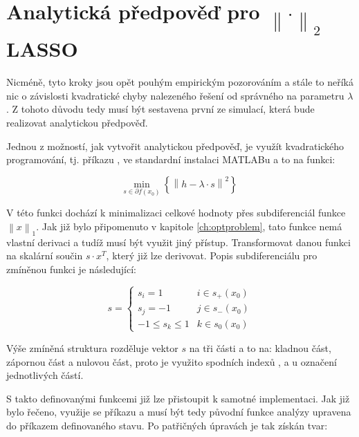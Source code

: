 \documentclass[FM,BP]{tulthesis}
\newcounter{Vzorce}
\begin{document}
\section{Analytická předpověď pro $\left\| \cdot \right\|_{2}$ LASSO}
\label{subch:l2Analytic}
Nicméně, tyto kroky jsou opět pouhým empirickým pozorováním a stále to neříká nic o závislosti kvadratické chyby nalezeného řešení od správného na parametru $\lambda$. Z tohoto důvodu tedy musí být sestavena první ze simulací, která bude realizovat analytickou předpověď.

Jednou z možností, jak vytvořit analytickou předpověď, je využít kvadratického programování, tj. příkazu , ve standardní instalaci MATLABu a to na funkci:

\begin{equation} \label{eq:analyza}  \tag{Vzorec \theVzorce}
\underset{s \in \partial f(x_0)} {\mathrm{min}} ~\left\{ \left\| h - \lambda \cdot s\right\| ^2 \right\}
\end{equation}

V této funkci dochází k minimalizaci celkové hodnoty přes subdiferenciál funkce $\left\| x\right\|_1 $. Jak již bylo připomenuto v kapitole \ref{ch:optproblem}, tato funkce nemá vlastní derivaci a tudíž musí být využit jiný přístup. Transformovat danou funkci na skalární součin $s \cdot x^{T}$, který již lze derivovat. Popis subdiferenciálu pro zmíněnou funkci je následující:

\begin{equation} \label{eq:subdif} \tag{Vzorec \theVzorce}
s = \begin{cases}
s_i = 1 & i \in s_+(x_0)\\
s_j = -1 & j \in s_-(x_0)\\
-1 \le s_k \le 1 & k \in s_0(x_0)
\end{cases}
\end{equation}

Výše zmíněná struktura rozděluje vektor $s$ na tři části a to na: kladnou část, zápornou část a nulovou část, proto je využito spodních indexů \uv{+}, \uv{-} a  u označení jednotlivých částí. 

S takto definovanými funkcemi již lze přistoupit k samotné implementaci. Jak již bylo řečeno, využije se příkazu  a musí být tedy původní funkce analýzy upravena do příkazem definovaného stavu. Po patřičných úpravách je tak získán tvar:
\end{document}
